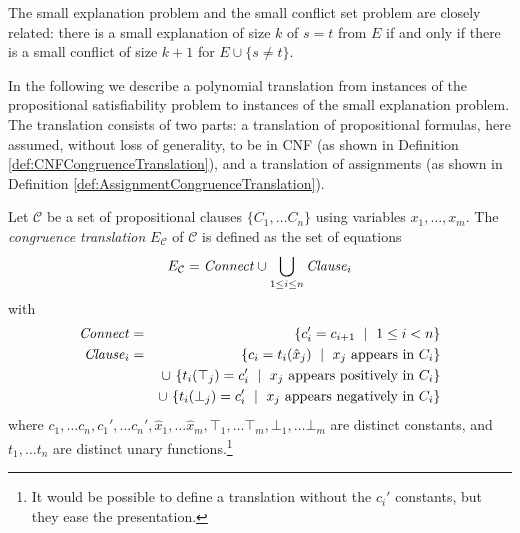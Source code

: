 \documentclass[smallextended]{svjour3}
\newcommand{\Clause}{{\it Clause}}
\newcommand{\Connect}{{\it Connect}}
\begin{document}
\noindent The small explanation problem and the small conflict set
problem are closely related: there is a small explanation of size $k$ of $s=t$
from $E$ if and only if there is a small conflict of size $k+1$ for $E \cup
\{s\neq t\}$.  


In the following we describe a polynomial translation from instances of the propositional satisfiability problem to instances of the small explanation problem.
The translation consists of two
parts: a translation of propositional formulas, here assumed, without loss
of generality, to be in CNF (as shown in Definition \ref{def:CNFCongruenceTranslation}), and a translation of assignments (as shown in Definition \ref{def:AssignmentCongruenceTranslation}).


\begin{definition}
\label{def:CNFCongruenceTranslation}
Let $\mathcal{C}$ be a set of propositional clauses $\{C_1,\ldots C_n\}$ using variables $x_1,\ldots,x_m$.
The \emph{congruence translation} $E_{\mathcal{C}}$ of\/ $\mathcal{C}$ is defined as the set of equations
\begin{equation*}
E_{\mathcal{C}} = \Connect \cup \bigcup_{1 \leq i \leq n}\Clause_i 
\end{equation*}
with
\begin{eqnarray*}
	\Connect &=& \{ c_{i}' = c_{i+1} \ \mid\ 1 \leq i < n\}\\
        \Clause_i &=& \{ c_i = t_i(\hat{x}_j) \ \mid\ x_j \text{ appears in } C_i \}\\
           & & \cup\ \{ t_i(\top_j) = c_i' \ \mid\ x_j \text{ appears positively in } C_i \}\\
           & & \cup\ \{ t_i(\bot_j) = c_i' \ \mid\ x_j \text{ appears negatively in } C_i \}
\end{eqnarray*}
where $c_{1},\dots c_{n},c_{1}', \dots c_{n}',
\hat{x}_1, \dots \hat{x}_m, \top_1, \dots \top_m, \bot_1, \dots \bot_m$ are distinct constants, and $t_1, \dots t_n$ are
distinct unary functions.\footnote{It would be possible to define a translation without the $c_i'$ constants, but they ease the presentation.}
\end{definition}
\end{document}
